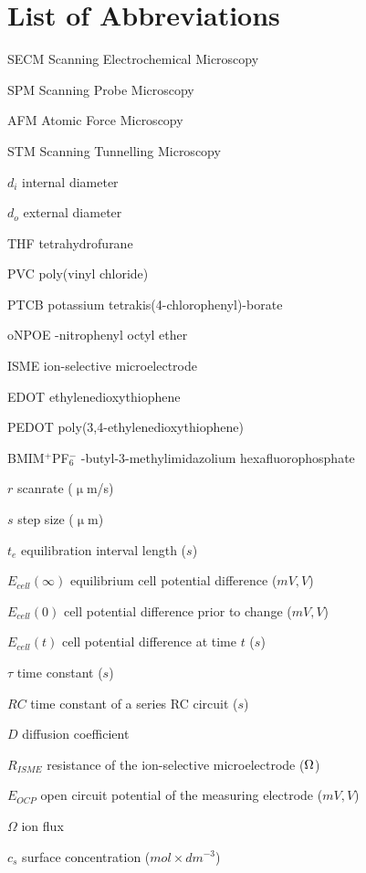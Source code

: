 \chapter{List of Abbreviations}
SECM \dotfill Scanning Electrochemical Microscopy

SPM \dotfill Scanning Probe Microscopy

AFM \dotfill Atomic Force Microscopy

STM \dotfill Scanning Tunnelling Microscopy

$d_i$ \dotfill internal diameter

$d_o$ \dotfill external diameter

THF \dotfill tetrahydrofurane

PVC \dotfill poly(vinyl chloride)

PTCB \dotfill potassium tetrakis(4-chlorophenyl)-borate

oNPOE -nitrophenyl octyl ether

ISME \dotfill ion-selective microelectrode

EDOT \dotfill ethylenedioxythiophene

PEDOT \dotfill poly(3,4-ethylenedioxythiophene)

BMIM$^+$PF$_6^-$ -butyl-3-methylimidazolium hexafluorophosphate 

$r$ \dotfill scanrate ($\upmu$m/s)

$s$ \dotfill step size ($\upmu$m)

$t_e$ \dotfill equilibration interval length ($s$)

$E_{cell}(\infty)$ \dotfill equilibrium cell potential difference ($mV, V$)

$E_{cell}(0)$ \dotfill cell potential difference prior to change ($mV, V$)

$E_{cell}(t)$ \dotfill cell potential difference at time $t$ ($s$)

$\tau$ \dotfill time constant ($s$)

$RC$ \dotfill time constant of a series RC circuit ($s$)

$D$ \dotfill diffusion coefficient

$R_{ISME}$ \dotfill resistance of the ion-selective microelectrode ($\ohm$)

$E_{OCP}$ \dotfill open circuit potential of the measuring electrode ($mV, V$)

$\Omega$ \dotfill ion flux

$c_s$ \dotfill surface concentration ($mol \times dm^{-3}$)

